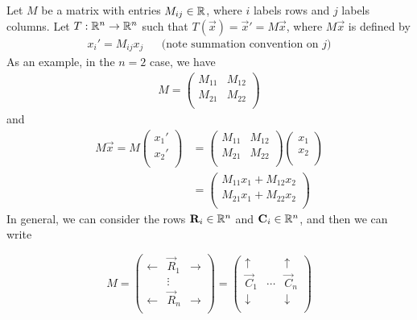 \documentclass{../template/note}
\begin{document}
    Let \(M\) be a matrix with entries \(M_{ij} \in \mathbb R\), where \(i\) labels rows and \(j\) labels columns. Let \(T: \mathbb R^n \to \mathbb R^n\) such that \(T(\vec x) = \vec x' = M\vec x\), where \(M \vec x\) is defined by
    \begin{align*}
        x_i' = M_{ij}x_j && \text{(note summation convention on } j \text{)}
    \end{align*}
    As an example, in the \(n=2\) case, we have
    \begin{align*}
        M = \begin{pmatrix}
         M_{11} & M_{12} \\
         M_{21} & M_{22} \\
        \end{pmatrix}
    \end{align*}
    and
    \begin{align*}
        M\vec x = M\begin{pmatrix}
         x_1' \\
         x_2' \\
        \end{pmatrix}
        &= \begin{pmatrix}
         M_{11} & M_{12} \\
         M_{21} & M_{22} \\
        \end{pmatrix}
        \begin{pmatrix}
         x_1 \\
         x_2 \\
        \end{pmatrix} \\
        &= \begin{pmatrix}
         M_{11}x_1 + M_{12}x_2 \\
         M_{21}x_1 + M_{22}x_2 \\
        \end{pmatrix}
    \end{align*}
    In general, we can consider the rows \(\vec R_i \in \RR^n\) and \(\vec C_i \in \RR^n\), and then we can write

    \[  
        M = \begin{pmatrix}
         \leftarrow & \vec R_1 & \rightarrow \\
          & \vdots &  \\
         \leftarrow & \vec R_n & \rightarrow \\
        \end{pmatrix}
        = \begin{pmatrix}
         \uparrow &  & \uparrow \\
         \vec C_1 & \cdots & \vec C_n \\
         \downarrow &  & \downarrow \\
        \end{pmatrix}
    \]
    
\end{document}
